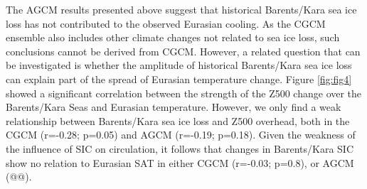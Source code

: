 \documentclass{nature}
\begin{document}
The AGCM results presented above suggest that historical Barents/Kara sea ice loss has not contributed to the observed Eurasian cooling. As the CGCM ensemble also includes other climate changes not related to sea ice loss, such conclusions cannot be derived from CGCM. However, a related question that can be investigated is whether the amplitude of historical Barents/Kara sea ice loss can explain part of the spread of Eurasian temperature change. Figure \ref{fig:fig4} showed a significant correlation between the strength of the Z500 change over the Barents/Kara Seas and Eurasian temperature. However, we only find a weak relationship between Barents/Kara sea ice loss and Z500 overhead, both in the CGCM (r=-0.28; p=0.05) and AGCM (r=-0.19; p=0.18). Given the weakness of the influence of SIC on circulation, it follows that changes in Barents/Kara SIC show no relation to Eurasian SAT in either CGCM (r=-0.03; p=0.8), or AGCM (@@).



\end{document}
